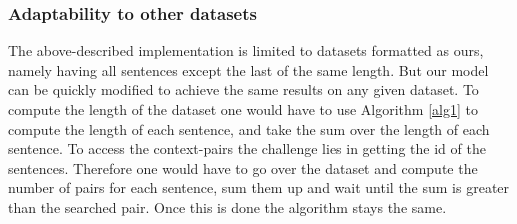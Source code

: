 \subsubsection{Adaptability to other datasets}
The above-described implementation is limited to datasets formatted as ours, namely having all sentences except the last of the same length. But our model can be quickly modified to achieve the same results on any given dataset. To compute the length of the dataset one would have to use Algorithm \ref{alg1} to compute the length of each sentence, and take the sum over  the length of each sentence. To access the context-pairs the challenge lies in getting the id of the sentences. Therefore one would have to go over the dataset and compute the number of pairs for each sentence, sum them up and wait until the sum is greater than the searched pair. Once this is done the algorithm stays the same. 

